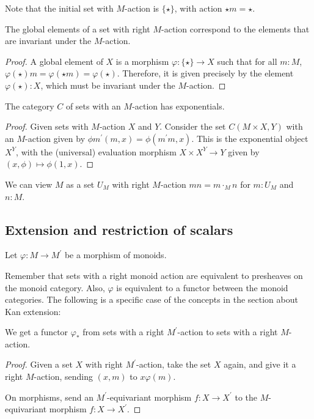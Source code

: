 Note that the initial set with $ M $-action is $ \{ \star \} $, with action $ \star m = \star $.

\begin{lemma}\label{lem:global-action-elements}
  The global elements of a set with right $ M $-action correspond to the elements that are invariant under the $ M $-action.
\end{lemma}
\begin{proof}
  A global element of $ X $ is a morphism $ \varphi: \{ \star \} \to X $ such that for all $ m: M $, $ \varphi(\star)m = \varphi(\star m) = \varphi(\star) $. Therefore, it is given precisely by the element $ \varphi(\star): X $, which must be invariant under the $ M $-action.
\end{proof}

\begin{lemma}
  The category $ C $ of sets with an $ M $-action has exponentials.
\end{lemma}
\begin{proof}
  Given sets with $ M $-action $ X $ and $ Y $. Consider the set $ C(M \times X, Y) $ with an $ M $-action given by $ \phi m^\prime(m, x) = \phi(m^\prime m, x) $. This is the exponential object $ X^Y $, with the (universal) evaluation morphism $ X \times X^Y \to Y $ given by $ (x, \phi) \mapsto \phi(1, x) $.
\end{proof}

\begin{definition}
  We can view $ M $ as a set $ U_M $ with right $ M $-action $ m n = m \cdot_M n $ for $ m: U_M $ and $ n: M $.
\end{definition}

\subsection{Extension and restriction of scalars}

Let $ \varphi: M \to M^\prime $ be a morphism of monoids.

Remember that sets with a right monoid action are equivalent to presheaves on the monoid category. Also, $ \varphi $ is equivalent to a functor between the monoid categories. The following is a specific case of the concepts in the section about Kan extension:

\begin{lemma}
  We get a  functor $ \varphi_* $ from sets with a right $ M^\prime $-action to sets with a right $ M $-action.
\end{lemma}
\begin{proof}
  Given a set $ X $ with right $ M^\prime $-action, take the set $ X $ again, and give it a right $ M $-action, sending $ (x, m) $ to $ x \varphi(m) $.

  On morphisms, send an $ M^\prime $-equivariant morphism $ f: X \to X^\prime $ to the $ M $-equivariant morphism $ f: X \to X^\prime $.
\end{proof}


